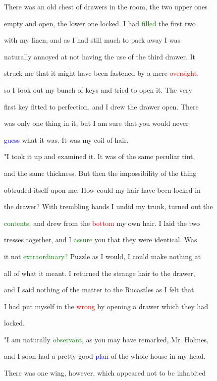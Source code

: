  There was an old chest of drawers in the room, the two upper ones

 empty and open, the lower one locked. I had \textcolor{green}{filled} the first two

 with my linen, and as I had still much to pack away I was

 naturally annoyed at not having the use of the third drawer. It

 struck me that it might have been fastened by a mere \textcolor{red}{oversight,}

 so I took out my bunch of keys and tried to open it. The very

 first key fitted to \textcolor{BurntOrange}{perfection,} and I drew the drawer open. There

 was only one thing in it, but I am sure that you would never

 \textcolor{blue}{guess} what it was. It was my coil of hair.



 "I took it up and examined it. It was of the same peculiar tint,

 and the same thickness. But then the impossibility of the thing

 obtruded itself upon me. How could my hair have been locked in

 the drawer? With trembling hands I undid my trunk, turned out the

 \textcolor{green}{contents,} and drew from the \textcolor{red}{bottom} my own hair. I laid the two

 tresses together, and I \textcolor{green}{assure} you that they were identical. Was

 it not \textcolor{green}{extraordinary?} Puzzle as I would, I could make nothing at

 all of what it meant. I returned the strange hair to the drawer,

 and I said nothing of the matter to the Rucastles as I felt that

 I had put myself in the \textcolor{red}{wrong} by opening a drawer which they had

 locked.



 "I am naturally \textcolor{green}{observant,} as you may have remarked, Mr. Holmes,

 and I soon had a \textcolor{BurntOrange}{pretty} \textcolor{BurntOrange}{good} \textcolor{blue}{plan} of the whole house in my head.

 There was one wing, however, which appeared not to be inhabited

